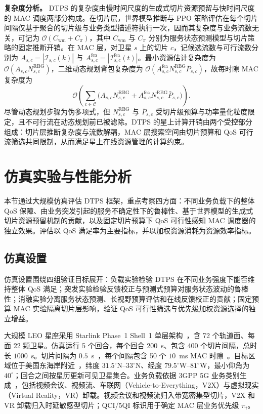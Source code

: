 \textbf{复杂度分析。} DTPS 的复杂度由慢时间尺度的生成式切片资源预留与快时间尺度的 MAC 调度两部分构成。在切片层，世界模型推断与 PPO 策略评估在每个切片间隔仅基于聚合的切片级与业务类型描述符执行一次，因而其复杂度与业务流数无关，可记为 $\mathcal O(C_{\mathrm{wm}}+C_\pi)$，其中 $C_{\mathrm{wm}}$ 与 $C_\pi$ 分别为服务状态预测模型与切片策略的固定推断开销。在 MAC 层，对卫星 $s$ 上的切片 $c$，记候选流数与可行流数分别为 $A_{s,c}=|\mathcal I_{s,c}(k)|$ 与 $A_{s,c}^{\mathrm{fea}}=|\mathcal I_{s,c}^{\mathrm{fea}}(t)|$。最小资源估计复杂度为 $\mathcal O(A_{s,c}N_{s,c}^{\mathrm{RBG}})$，二维动态规划背包复杂度为 $\mathcal O(A_{s,c}^{\mathrm{fea}}N_{s,c}^{\mathrm{RBG}}\bar P_{s,c})$，故每时隙 MAC 复杂度为
\begin{equation}\label{eq:ch4_complexity}
\mathcal O\!\left(\sum_{c\in\mathcal C}\big(A_{s,c}N_{s,c}^{\mathrm{RBG}}+A_{s,c}^{\mathrm{fea}}N_{s,c}^{\mathrm{RBG}}\bar P_{s,c}\big)\right).
\end{equation}
尽管动态规划步骤为伪多项式，但 $N_{s,c}^{\mathrm{RBG}}$ 与 $\bar P_{s,c}$ 受切片级预算与功率量化粒度限定，且不可行流在动态规划前已被滤除。DTPS 的星上计算开销由两个受控部分组成：切片层推断复杂度与流数解耦，MAC 层搜索空间由切片预算和 QoS 可行流筛选共同限制，从而满足星上在线资源管理的计算约束。

\section{仿真实验与性能分析}
\label{sec:ch4_experiments}

本节通过大规模仿真评估 DTPS 框架，重点考察四方面：不同业务负载下的整体 QoS 保障、由业务突发引起的服务不确定性下的鲁棒性、基于世界模型的生成式切片资源预留机制的贡献，以及固定切片预算下 QoS 可行性感知 MAC 调度器的独立效果。评估以 QoS 满足率为主要指标，并以加权资源消耗为资源效率指标。

\subsection{仿真设置}
\label{subsec:ch4_setup}

仿真设置围绕四组验证目标展开：负载实验检验 DTPS 在不同业务强度下能否维持整体 QoS 满足；突发实验检验反馈校正与预测式预算对服务状态波动的鲁棒性；消融实验分离服务状态预测、长视野预算评估和在线反馈校正的贡献；固定预算 MAC 实验隔离切片层影响，验证 QoS 可行性筛选与优先级加权资源选择的独立增益。

大规模 LEO 星座采用 Starlink Phase~1 Shell~1 单层架构~\cite{Bhattacherjee-Singla-NetworkTopologyDesign-CCS19}，含 72 个轨道面、每面 22 颗卫星。仿真运行 5 个回合，每个回合 $200$~s、包含 400 个切片间隔，总时长 $1000$~s。切片间隔为 $0.5$~s~\cite{yao-LEOEdge-JSAC25}，每个间隔包含 50 个 $10$~ms MAC 时隙~\cite{3gpp_ts_36_211}。目标区域位于美国东海岸附近~\cite{liu-reconfigurableRAN-TCCN25}，纬度 $31.5^\circ$N--$33^\circ$N、经度 $79.5^\circ$W--$81^\circ$W，最小仰角为 $40^\circ$；回合之间按星历更新可见卫星集合。业务负载依据 3GPP 5G 业务类别生成~\cite{etsi_3gpp_5g_system_architecture_2018}，包括视频会议、视频流、车联网（Vehicle-to-Everything，V2X）与虚拟现实（Virtual Reality，VR）卸载。视频会议和视频流归入带宽密集型切片，V2X 和 VR 卸载归入时延敏感型切片；QCI/5QI 标识用于确定 MAC 层业务优先级 $\pi_i$。

